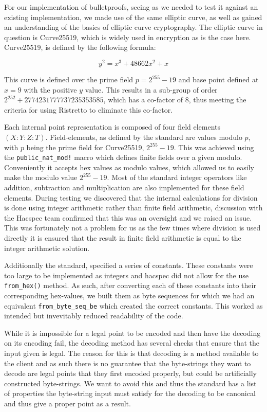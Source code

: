 \documentclass{article}
\begin{document}
For our implementation of bulletproofs, seeing as we needed to test it
against an existing implementation, we made use of the same elliptic
curve, as well as gained an understanding of the basics of elliptic
curve cryptography. The elliptic curve in question is Curve25519, which
is widely used in encryption as is the case here. Curve25519, is defined by the following formula:

$$y^2 = x^3 + 48662x^2 + x$$

This curve is defined over the prime field $p = 2^{255} - 19$ and base
point defined at $x = 9$ with the positive $y$ value. This results in a
sub-group of order $2^{252} + 2774231777737235353585$, which has a
co-factor of $8$, thus meeting the criteria for using Ristretto to eliminate this co-factor.

Each internal point representation is composed of four field elements
$(X : Y : Z : T)$. Field-elements, as defined by the standard are
values modulo $p$, with $p$ being the prime field for Curve25519,
$2^{255} - 19$. This was achieved using the \texttt{public\_nat\_mod!}
macro which defines finite fields over a given modulo. Conveniently it
accepts hex values as modulo values, which allowed us to easily make
the modulo value $2^{255} - 19$. Most of the standard integer operators
like addition, subtraction and multiplication are also implemented for
these field elements. During testing we discovered that the internal
calculations for division is done using integer arithmetic rather than
finite field arithmetic, discussion with the Hacspec team confirmed
that this was an oversight and we raised an issue. This was fortunately
not a problem for us as the few times where division is used directly
it is ensured that the result in finite field arithmetic is equal to
the integer arithmetic solution.

Additionally the standard, specified a series of constants. These
constants were too large to be implemented as integers and hacspec
did not allow for the use \texttt{from\_hex()} method. As such, after
converting each of these constants into their corresponding hex-values,
we built them as byte sequences for which we had an equivalent
\texttt{from\_byte\_seq\_be} which created the correct constants. This
worked as intended but invevitably reduced readability of the code.

While it is impossible for a legal point to be encoded and then have the
decoding on its encoding fail, the decoding method has several checks
that ensure that the input given is legal. The reason for this
is that decoding is a method available to the client and as such there
is no guarantee that the byte-strings they want to decode are legal
points that they first encoded properly, but could be artificially
constructed byte-strings. We want to avoid this and thus the standard
has a list of properties the byte-string input must satisfy for the
decoding to be canonical and thus give a proper point as a result.
\end{document}
